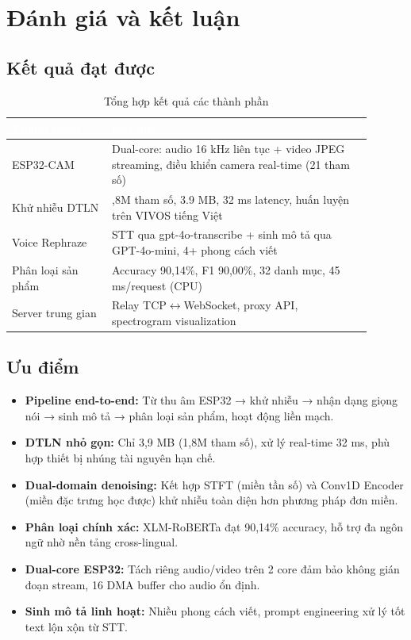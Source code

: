 \chapter{Đánh giá và kết luận}

\section{Kết quả đạt được}

\begin{table}[htbp]
\centering
\caption{Tổng hợp kết quả các thành phần}
\label{tab:results}
\begin{tabular}{>{\raggedright\arraybackslash}p{0.25\linewidth} >{\raggedright\arraybackslash}p{0.65\linewidth}}
\toprule
\rowcolor{headerblue} \textcolor{white}{\textbf{Thành phần}} & \textcolor{white}{\textbf{Kết quả}} \\
\midrule
\rowcolor{rowgray} ESP32-CAM & Dual-core: audio 16 kHz liên tục + video JPEG streaming, điều khiển camera real-time (21 tham số) \\
Khử nhiễu DTLN & 1,8M tham số, 3.9 MB, 32 ms latency, huấn luyện trên VIVOS tiếng Việt \\
\rowcolor{rowgray} Voice Rephraze & STT qua gpt-4o-transcribe + sinh mô tả qua GPT-4o-mini, 4+ phong cách viết \\
Phân loại sản phẩm & Accuracy 90,14\%, F1 90,00\%, 32 danh mục, 45 ms/request (CPU) \\
\rowcolor{rowgray} Server trung gian & Relay TCP$\leftrightarrow$WebSocket, proxy API, spectrogram visualization \\
\bottomrule
\end{tabular}
\end{table}

\section{Ưu điểm}

\begin{itemize}
\item
  \textbf{Pipeline end-to-end:} Từ thu âm ESP32 → khử nhiễu → nhận dạng giọng nói
  → sinh mô tả → phân loại sản phẩm, hoạt động liền mạch.
\item
  \textbf{DTLN nhỏ gọn:} Chỉ 3,9 MB (1,8M tham số), xử lý real-time 32 ms,
  phù hợp thiết bị nhúng tài nguyên hạn chế.
\item
  \textbf{Dual-domain denoising:} Kết hợp STFT (miền tần số) và Conv1D Encoder
  (miền đặc trưng học được) khử nhiễu toàn diện hơn phương pháp đơn miền.
\item
  \textbf{Phân loại chính xác:} XLM-RoBERTa đạt 90,14\% accuracy, hỗ trợ
  đa ngôn ngữ nhờ nền tảng cross-lingual.
\item
  \textbf{Dual-core ESP32:} Tách riêng audio/video trên 2 core đảm bảo
  không gián đoạn stream, 16 DMA buffer cho audio ổn định.
\item
  \textbf{Sinh mô tả linh hoạt:} Nhiều phong cách viết, prompt engineering
  xử lý tốt text lộn xộn từ STT.
\end{itemize}


